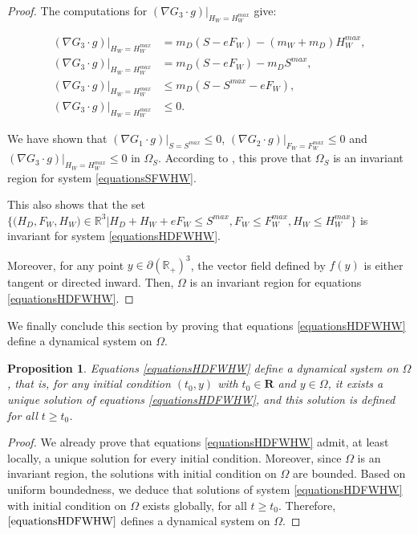 \documentclass{article}
\newtheorem{prop}{Proposition}
\begin{document}
\begin{proof}
The computations for $(\nabla G_3 \cdot g)|_{H_W = H_W^{max}}$ give:

\begin{align*}
(\nabla G_3 \cdot g)|_{H_W = H_W^{max}} &= m_D (S - eF_W) - (m_W + m_D) H_W^{max}, \\
(\nabla G_3 \cdot g)|_{H_W = H_W^{max}} &= m_D (S - eF_W) - m_D S^{max}, \\
(\nabla G_3 \cdot g)|_{H_W = H_W^{max}} & \leq m_D (S - S^{max} -  eF_W), \\
(\nabla G_3 \cdot g)|_{H_W = H_W^{max}} & \leq 0.
\end{align*}

We have shown that $(\nabla G_1 \cdot g)|_{S = S^{max}} \leq 0$, $(\nabla G_2 \cdot g)|_{F_W = F_W^{max}} \leq 0$ and $(\nabla G_3 \cdot g)|_{H_W = H_W^{max}} \leq 0$ in  $\Omega_S$.  According to \cite{smoller_shock_1994}, this prove that $\Omega_S$ is an invariant region for system \eqref{equationsSFWHW}.

This also shows that the set  $\Big\{\Big(H_D, F_W, H_W \Big) \in \mathbb{R}^3  \Big|H_D + H_W + eF_W \leq S^{max}, F_W \leq F_W^{max}, H_W \leq H_W^{max} \Big\}$ is invariant for system \eqref{equationsHDFWHW}. 


Moreover, for any point $y \in \partial (\mathbb{R}_+)^3$, the vector field defined by $f(y)$ is either tangent or directed inward. Then, $\Omega$ is an invariant region for equations \eqref{equationsHDFWHW}. 

\end{proof}


We finally conclude this section by proving that equations \eqref{equationsHDFWHW} define a dynamical system on $\Omega$.

\begin{prop}
Equations \eqref{equationsHDFWHW} define a dynamical system on $\Omega$, that is, for any initial condition $(t_0, y)$ with $t_0 \in \mathbf{R}$ and $y \in \Omega$, it exists a unique solution of equations \eqref{equationsHDFWHW}, and this solution is defined for all $t \geq t_0$.
\end{prop}

\begin{proof}
We already prove that equations \eqref{equationsHDFWHW} admit, at least locally, a unique solution for every initial condition. Moreover, since $\Omega$ is an invariant region, the solutions with initial condition on $\Omega$ are bounded. Based on uniform boundedness, we deduce that solutions of system \eqref{equationsHDFWHW} with initial condition on $\Omega$ exists globally, for all $t\geq t_0$. Therefore, $\eqref{equationsHDFWHW}$ defines a dynamical system on $\Omega$.
\end{proof}
\end{document}
